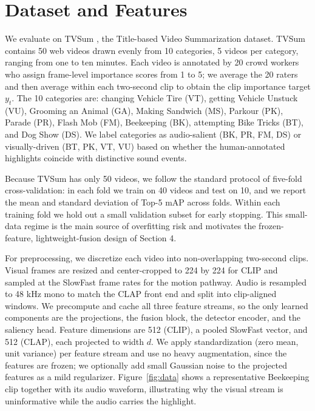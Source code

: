 \documentclass[10pt,twocolumn,letterpaper]{article}
\begin{document}
\section{Dataset and Features}

We evaluate on TVSum \cite{tvsum}, the Title-based Video Summarization dataset. TVSum contains 50 web videos drawn evenly from 10 categories, 5 videos per category, ranging from one to ten minutes. Each video is annotated by 20 crowd workers who assign frame-level importance scores from 1 to 5; we average the 20 raters and then average within each two-second clip to obtain the clip importance target $y_t$. The 10 categories are: changing Vehicle Tire (VT), getting Vehicle Unstuck (VU), Grooming an Animal (GA), Making Sandwich (MS), Parkour (PK), Parade (PR), Flash Mob (FM), Beekeeping (BK), attempting Bike Tricks (BT), and Dog Show (DS). We label categories as audio-salient (BK, PR, FM, DS) or visually-driven (BT, PK, VT, VU) based on whether the human-annotated highlights coincide with distinctive sound events.

Because TVSum has only 50 videos, we follow the standard protocol of five-fold cross-validation: in each fold we train on 40 videos and test on 10, and we report the mean and standard deviation of Top-5 mAP across folds. Within each training fold we hold out a small validation subset for early stopping. This small-data regime is the main source of overfitting risk and motivates the frozen-feature, lightweight-fusion design of Section 4.

For preprocessing, we discretize each video into non-overlapping two-second clips. Visual frames are resized and center-cropped to 224 by 224 for CLIP and sampled at the SlowFast frame rates for the motion pathway. Audio is resampled to 48 kHz mono to match the CLAP front end and split into clip-aligned windows. We precompute and cache all three feature streams, so the only learned components are the projections, the fusion block, the detector encoder, and the saliency head. Feature dimensions are 512 (CLIP), a pooled SlowFast vector, and 512 (CLAP), each projected to width $d$. We apply standardization (zero mean, unit variance) per feature stream and use no heavy augmentation, since the features are frozen; we optionally add small Gaussian noise to the projected features as a mild regularizer. Figure~\ref{fig:data} shows a representative Beekeeping clip together with its audio waveform, illustrating why the visual stream is uninformative while the audio carries the highlight.
\end{document}
